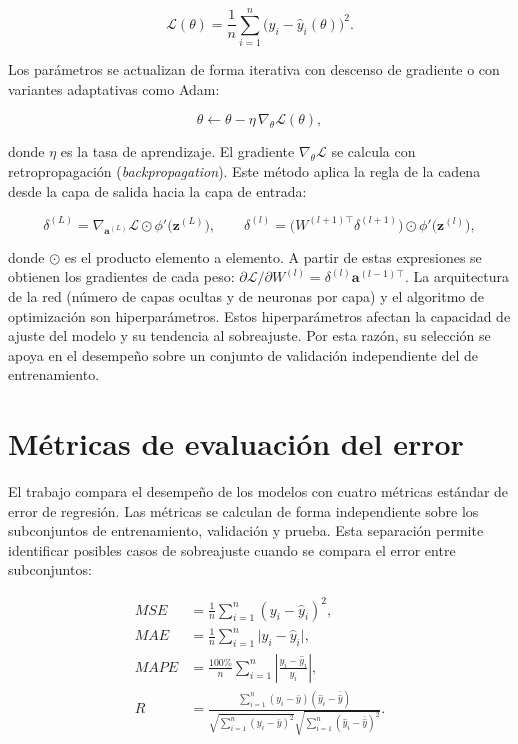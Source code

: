 \begin{equation}
\mathcal{L}(\theta) = \frac{1}{n}\sum_{i=1}^n \big(y_i - \hat{y}_i(\theta)\big)^2.
\label{eq:mlp_loss}
\end{equation}

Los parámetros se actualizan de forma iterativa con descenso de gradiente o con variantes adaptativas como Adam:

\begin{equation}
\theta \leftarrow \theta - \eta \, \nabla_\theta \mathcal{L}(\theta),
\label{eq:mlp_gradiente}
\end{equation}

donde $\eta$ es la tasa de aprendizaje. El gradiente $\nabla_\theta \mathcal{L}$ se calcula con retropropagación (\textit{backpropagation}). Este método aplica la regla de la cadena desde la capa de salida hacia la capa de entrada:

\begin{equation}
\delta^{(L)} = \nabla_{\mathbf{a}^{(L)}}\mathcal{L} \odot \phi'\big(\mathbf{z}^{(L)}\big), \qquad
\delta^{(l)} = \big(W^{(l+1)\top}\delta^{(l+1)}\big) \odot \phi'\big(\mathbf{z}^{(l)}\big),
\label{eq:mlp_backprop}
\end{equation}

donde $\odot$ es el producto elemento a elemento. A partir de estas expresiones se obtienen los gradientes de cada peso: $\partial \mathcal{L}/\partial W^{(l)} = \delta^{(l)} \mathbf{a}^{(l-1)\top}$. La arquitectura de la red (número de capas ocultas y de neuronas por capa) y el algoritmo de optimización son hiperparámetros. Estos hiperparámetros afectan la capacidad de ajuste del modelo y su tendencia al sobreajuste. Por esta razón, su selección se apoya en el desempeño sobre un conjunto de validación independiente del de entrenamiento.

\section{Métricas de evaluación del error}
\label{sec:metricas}

El trabajo compara el desempeño de los modelos con cuatro métricas estándar de error de regresión. Las métricas se calculan de forma independiente sobre los subconjuntos de entrenamiento, validación y prueba. Esta separación permite identificar posibles casos de sobreajuste cuando se compara el error entre subconjuntos:

\begin{align}
MSE &= \frac{1}{n}\sum_{i=1}^n (y_i-\hat{y}_i)^2, \label{eq:mse}\\
MAE &= \frac{1}{n}\sum_{i=1}^n \lvert y_i-\hat{y}_i\rvert, \label{eq:mae}\\
MAPE &= \frac{100\%}{n}\sum_{i=1}^n \left\lvert\frac{y_i-\hat{y}_i}{y_i}\right\rvert, \label{eq:mape}\\
R &= \frac{\sum_{i=1}^n (y_i-\bar{y})(\hat{y}_i-\bar{\hat{y}})}{\sqrt{\sum_{i=1}^n (y_i-\bar{y})^2}\sqrt{\sum_{i=1}^n (\hat{y}_i-\bar{\hat{y}})^2}}. \label{eq:corr_r}
\end{align}

